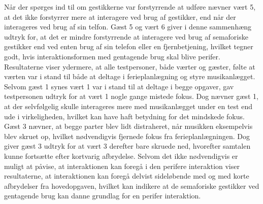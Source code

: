 Når der spørges ind til om gestikkerne var forstyrrende at udføre nævner vært 5, at det ikke forstyrrer mere at interagere ved brug af gestikker, end når der interageres ved brug af sin telfon. Gæst 5 og vært 6 giver i denne sammenhæng udtryk for, at det er mindre forstyrrende at interagere ved brug af semaforiske gestikker end ved enten brug af sin telefon eller en fjernbetjening, hvilket tegner godt, hvis interaktionsformen med gentagende brug skal blive perifer. \blankline
%
Resultaterne viser ydermere, at alle testpersoner, både værter og gæster, følte at værten var i stand til både at deltage i ferieplanlægning og styre musikanlægget. Selvom gæst 1 synes vært 1 var i stand til at deltage i begge opgaver, gav testpersonen udtryk for at vært 1 nogle gange mistede fokus. Dog nævner gæst 1, at der selvfølgelig skulle interageres mere med musikanlægget under en test end ude i virkeligheden, hvilket kan have haft betydning for det mindskede fokus. Gæst 3 nævner, at begge parter blev lidt distraheret, når musikken eksempelvis blev skruet op, hvilket nødvendigvis fjernede fokus fra ferieplanlægningen. Dog giver gæst 3 udtryk for at vært 3 derefter bare skruede ned, hvorefter samtalen kunne fortsætte efter kortvarig afbrydelse. \blankline
%
Selvom det ikke nødvendigvis er muligt at påvise, at interaktionen kan foregå i den perifere interaktion viser resultaterne, at interaktionen kan foregå delvist sideløbende med og med korte afbrydelser fra hovedopgaven, hvilket kan indikere at de semaforiske gestikker ved gentagende brug kan danne grundlag for en perifer interaktion.


